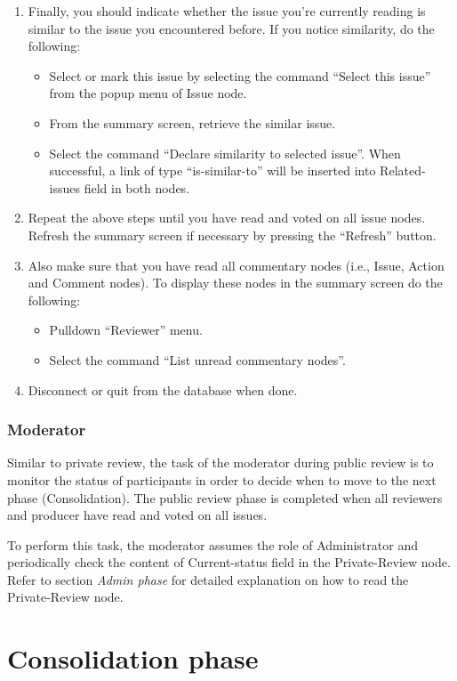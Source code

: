 \begin{enumerate}
\item Finally, you should indicate whether the issue you're currently
reading is similar to the issue you encountered before. If you notice
similarity, do the following:
\begin{itemize}
\item Select or mark this issue by selecting the command ``Select this
issue'' from the popup menu of Issue node.
\item From the summary screen, retrieve the similar issue.
\item Select the command ``Declare similarity to selected issue''.
 When successful, a link of type ``is-similar-to'' will be inserted
 into Related-issues field in  both nodes.
\end{itemize}
\item Repeat the above steps until you have read and voted on all
issue nodes. Refresh the summary screen if necessary by pressing the
``Refresh'' button. 
\item Also make sure that you have read all commentary nodes (i.e., Issue,
Action and Comment nodes). To display these nodes in the summary
screen do the following: 
 \begin{itemize}
   \item Pulldown ``Reviewer'' menu.
   \item Select the command ``List unread commentary nodes''.
 \end{itemize}
\item Disconnect or quit from the database when done.

\end{enumerate}

\subsubsection*{Moderator}
Similar to private review, the task of the moderator during public review
is to monitor the status of participants in order to decide when to
move to the next phase (Consolidation).
The public review phase is completed when all reviewers and producer
have read and voted on all issues.

To perform this task, the moderator assumes the role of
Administrator and periodically check the content of Current-status
field in the Private-Review node. Refer to section {\it Admin phase}
for detailed explanation on how to read the Private-Review node.

\section {Consolidation phase}

